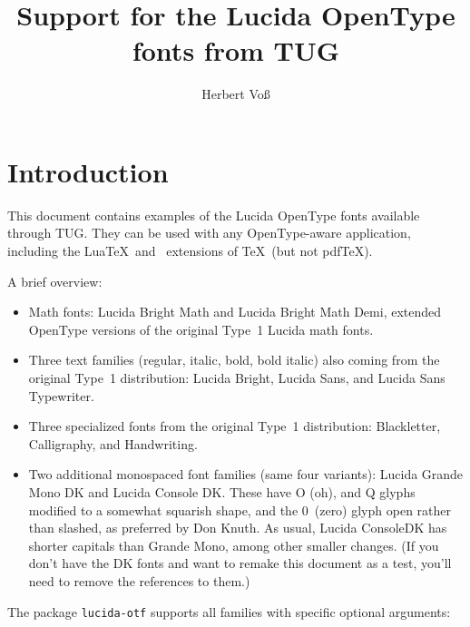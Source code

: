 \documentclass[11pt]{article}
\title{Support for the Lucida OpenType fonts from TUG}
\author{Herbert Voß}
\begin{document}
\maketitle
\tableofcontents

\section{Introduction}

{\def\thefootnote{}
}

This document contains examples of the Lucida OpenType fonts available
through TUG.  They can be used with any OpenType-aware application,
including the Lua\TeX\ and \XeTeX\ extensions of \TeX\ (but not
pdf\TeX).

A brief overview:

\begin{itemize}
\item Math fonts: Lucida Bright Math and Lucida Bright Math Demi,
extended OpenType versions of the original Type~1 Lucida math fonts.

\item Three text families (regular, italic, bold, bold italic) also 
coming from the original Type~1 distribution: Lucida Bright, Lucida
Sans, and Lucida Sans Typewriter.

\item Three specialized fonts from the original Type~1
distribution: Blackletter, Calligraphy, and Handwriting.

\item Two additional monospaced font families (same four variants):
Lucida Grande Mono DK and Lucida Console DK.  These have O (oh), and Q
glyphs modified to a somewhat squarish shape, and the 0~(zero) glyph
open rather than slashed, as preferred by Don Knuth.  As usual, Lucida
ConsoleDK has shorter capitals than Grande Mono, among other smaller
changes.  (If you don't have the DK fonts and want to remake this
document as a test, you'll need to remove the references to them.)

\end{itemize}

The package \texttt{lucida-otf} supports all families with specific optional
arguments:
\end{document}
